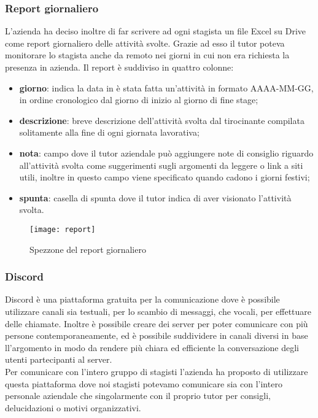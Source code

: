 \subsubsection{Report giornaliero}
L'azienda ha deciso inoltre di far scrivere ad ogni stagista un file Excel su Drive come report giornaliero delle attività svolte. Grazie ad esso il tutor poteva monitorare lo stagista anche da remoto nei giorni in cui non era richiesta la presenza in azienda. Il report è suddiviso in quattro colonne:
\begin{itemize}
	\item \textbf{giorno}: indica la data in è stata fatta un'attività in formato AAAA-MM-GG, in ordine cronologico dal giorno di inizio al giorno di fine stage;
	\item \textbf{descrizione}: breve descrizione dell'attività svolta dal tirocinante compilata solitamente alla fine di ogni giornata lavorativa;
	\item \textbf{nota}: campo dove il tutor aziendale può aggiungere note di consiglio riguardo all'attività svolta come suggerimenti sugli argomenti da leggere o link a siti utili, inoltre in questo campo viene specificato quando cadono i giorni festivi;
	\item \textbf{spunta}: casella di spunta dove il tutor indica di aver visionato l'attività svolta.
\end{itemize}

\begin{figure}[H]
	\begin{center}
		\texttt{[image: report]}
		\caption{Spezzone del report giornaliero}
	\end{center}
\end{figure}


\subsubsection{Discord}
Discord è una piattaforma gratuita per la comunicazione dove è possibile utilizzare canali sia testuali, per lo scambio di messaggi, che vocali, per effettuare delle chiamate. Inoltre è possibile creare dei server per poter comunicare con più persone contemporaneamente, ed è possibile suddividere in canali diversi in base ll'argomento in modo da rendere più chiara ed efficiente la conversazione degli utenti partecipanti al server.\\
Per comunicare con l'intero gruppo di stagisti l'azienda ha proposto di utilizzare questa piattaforma dove noi stagisti potevamo comunicare sia con l'intero personale aziendale che singolarmente con il proprio tutor per consigli, delucidazioni o motivi organizzativi.

